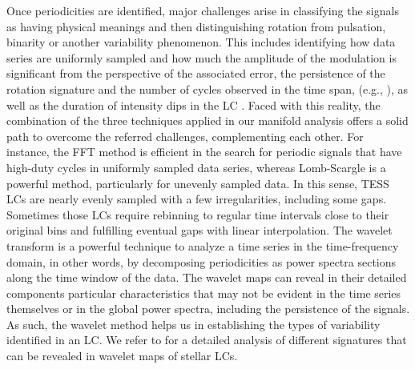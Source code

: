 \documentclass[RNAAS]{aastex63}
\begin{document}
Once periodicities are identified, major challenges arise in classifying the signals as having physical meanings and then distinguishing rotation from pulsation, binarity or another variability phenomenon. This includes identifying how data series are uniformly sampled and how much the amplitude of the modulation is significant from the perspective of the associated error, the persistence of the rotation signature and the number of cycles observed in the time span, (e.g., \citealp{deMedeiros2013,Canto2020}), as well as the duration of intensity dips in the LC \citep{Tan2020}. Faced with this reality, the combination of the three techniques applied in our manifold analysis offers a solid path to overcome the referred challenges, complementing each other. For instance, the FFT method is efficient in the search for periodic signals that have high-duty cycles in uniformly sampled data series, whereas Lomb-Scargle is a powerful method, particularly for unevenly sampled data. In this sense, TESS LCs are nearly evenly sampled with a few irregularities, including some gaps. Sometimes those LCs require rebinning to regular time intervals close to their original bins and fulfilling eventual gaps with linear interpolation. The wavelet transform is a powerful technique to analyze a time series in the time-frequency domain, in other words, by decomposing periodicities as power spectra sections along the time window of the data. The wavelet maps can reveal in their detailed components particular characteristics that may not be evident in the time series themselves or in the global power spectra, including the persistence of the signals. As such, the wavelet method helps us in establishing the types of variability identified in an LC. We refer to \citet{Bravo2014} for a detailed analysis of different signatures that can be revealed in wavelet maps of stellar LCs. 
\end{document}
